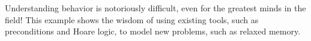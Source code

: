 Understanding \oota{} behavior is notoriously difficult, even for the
greatest minds in the field!  %
This example shows the wisdom of using existing tools, such as preconditions
and Hoare logic, to model new problems, such as relaxed memory.




